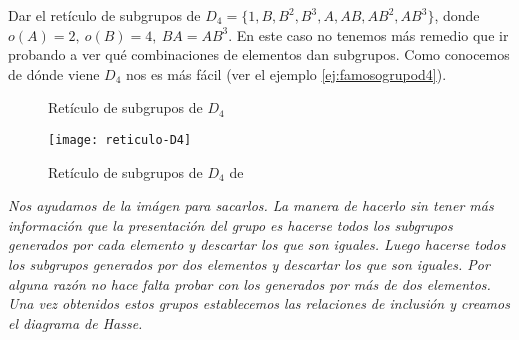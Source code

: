 \begin{ej}
	Dar el retículo de subgrupos de $D_4 = \{1, B, B^2, B^3, A, AB, AB^2, AB^3\}$, donde $o(A) = 2,\ o(B) = 4,\ BA=AB^3$. En este caso no tenemos más remedio que ir probando a ver qué combinaciones de elementos dan subgrupos. Como conocemos de dónde viene $D_4$ nos es más fácil (ver el ejemplo \ref{ej:famosogrupod4}).
	
	\begin{figure}[h]
		\centering
		\caption{Retículo de subgrupos de $D_4$}
		\label{fig:reticuloD4}
	\end{figure}
	
	\begin{figure}[h]
		\centering
		\texttt{[image: reticulo-D4]}
		\label{fig:reticuloD4dibujo}
		\caption{Retículo de subgrupos de $D_4$ de \cite{d4sub}}
	\end{figure}
	
	\textit{Nos ayudamos de la imágen para sacarlos. La manera de hacerlo sin tener más información que la presentación del grupo es hacerse todos los subgrupos generados por cada elemento y descartar los que son iguales. Luego hacerse todos los subgrupos generados por dos elementos y descartar los que son iguales. Por alguna razón no hace falta probar con los generados por más de dos elementos. Una vez obtenidos estos grupos establecemos las relaciones de inclusión y creamos el diagrama de Hasse.}
\end{ej}

